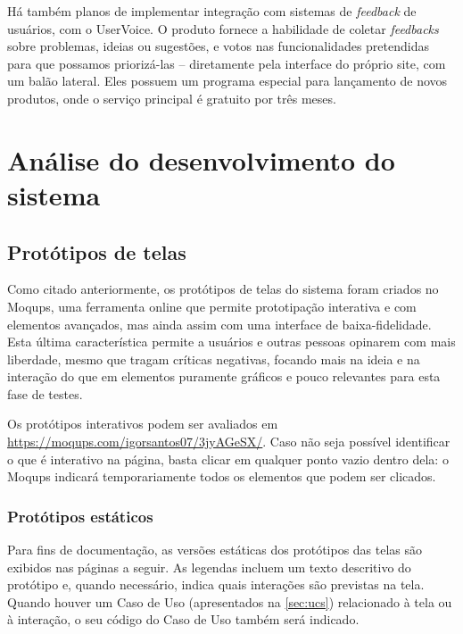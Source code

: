 \documentclass[12pt,a4paper,twoside,hyphens,english,brazil]{abntex2}
\begin{document}
{Há também planos de implementar integração com sistemas de \emph{feedback} de usuários, com o UserVoice. O produto fornece a habilidade de coletar \emph{feedbacks} sobre problemas, ideias ou sugestões, e votos nas funcionalidades pretendidas para que possamos priorizá-las -- diretamente pela interface do próprio site, com um balão lateral\cite{uservoice-product}. Eles possuem um programa especial para lançamento de novos produtos, onde o serviço principal é gratuito por três meses\cite{uservoice-launch}.


\section{Análise do desenvolvimento do sistema}


\subsection{Protótipos de telas}
Como citado anteriormente, os protótipos de telas do sistema foram criados no Moqups, uma ferramenta online que permite prototipação interativa e com elementos avançados, mas ainda assim com uma interface de baixa-fidelidade. Esta última característica permite a usuários e outras pessoas opinarem com mais liberdade, mesmo que tragam críticas negativas, focando mais na ideia e na interação do que em elementos puramente gráficos e pouco relevantes para esta fase de testes.\cite{low-fidelity-se}\cite{low-fidelity}

Os protótipos interativos podem ser avaliados em \url{https://moqups.com/igorsantos07/3jyAGeSX/}. Caso não seja possível identificar o que é interativo na página, basta clicar em qualquer ponto vazio dentro dela: o Moqups indicará temporariamente todos os elementos que podem ser clicados.

\subsubsection{Protótipos estáticos}
Para fins de documentação, as versões estáticas dos protótipos das telas são exibidos nas páginas a seguir. As legendas incluem um texto descritivo do protótipo e, quando necessário, indica quais interações são previstas na tela. Quando houver um Caso de Uso (apresentados na \autoref{sec:ucs}) relacionado à tela ou à interação, o seu código do Caso de Uso também será indicado.

}
\end{document}
